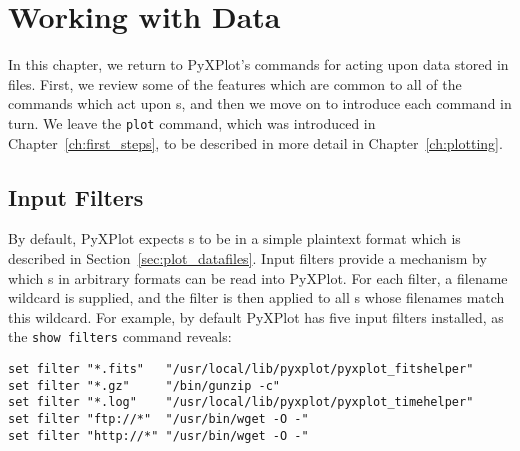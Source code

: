 %
%
%
%
%



\chapter{Working with Data}
\label{ch:numerics}

In this chapter, we return to PyXPlot's commands for acting upon data stored in
files. First, we review some of the features which are common to all of the
commands which act upon \datafile s, and then we move on to introduce each
command in turn. We leave the {\tt plot} command, which was introduced in
Chapter~\ref{ch:first_steps}, to be described in more detail in
Chapter~\ref{ch:plotting}.

\section{Input Filters}
\label{sec:filters}

By default, PyXPlot expects \datafile s to be in a simple plaintext format
which is described in Section~\ref{sec:plot_datafiles}. Input filters provide a
mechanism by which \datafile s in arbitrary formats can be read into PyXPlot.
For each filter, a filename wildcard is supplied, and the filter is then applied to
all \datafile s whose filenames match this wildcard. For example, by default
PyXPlot has five input filters installed, as the {\tt show filters} command
reveals:

\begin{verbatim}
set filter "*.fits"   "/usr/local/lib/pyxplot/pyxplot_fitshelper"
set filter "*.gz"     "/bin/gunzip -c"
set filter "*.log"    "/usr/local/lib/pyxplot/pyxplot_timehelper"
set filter "ftp://*"  "/usr/bin/wget -O -"
set filter "http://*" "/usr/bin/wget -O -"
\end{verbatim}

